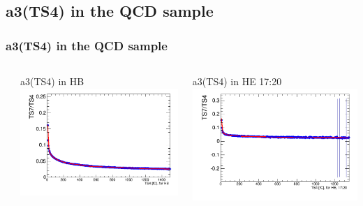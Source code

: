\documentclass[bigger]{beamer}
\begin{document}
\subsection{a3(TS4) in the QCD sample}
\label{sec-3-6}
\begin{frame}
\frametitle{a3(TS4) in the QCD sample}
\label{sec-3-6-1}
\begin{columns} %
\label{sec-3-6-1-1}
\begin{column}{0.55\textwidth}
\label{sec-3-6-1-1-1}

\centering
a3(TS4) in HB
\includegraphics[width=1.0\textwidth]{fig/a3_ring0.png}
\end{column}
\begin{column}{0.55\textwidth}
\label{sec-3-6-1-1-2}

\centering
a3(TS4) in HE 17:20
\includegraphics[width=1.0\textwidth]{fig/a3_ring1.png}
\end{column}
\end{columns}
\end{frame}
\end{document}
